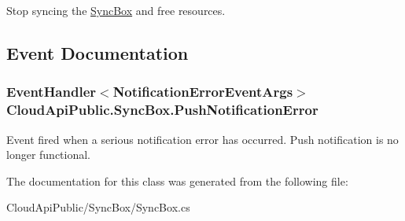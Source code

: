 Stop syncing the \hyperlink{class_cloud_api_public_1_1_sync_box}{Sync\-Box} and free resources. 



\subsection{Event Documentation}
\hypertarget{class_cloud_api_public_1_1_sync_box_a37dc0c1c783ead1a4404e90016d9df60}{
\subsubsection[{Push\-Notification\-Error}]{\setlength{\rightskip}{0pt plus 5cm}Event\-Handler$<${\bf Notification\-Error\-Event\-Args}$>$ Cloud\-Api\-Public.\-Sync\-Box.\-Push\-Notification\-Error}}\label{class_cloud_api_public_1_1_sync_box_a37dc0c1c783ead1a4404e90016d9df60}


Event fired when a serious notification error has occurred. Push notification is no longer functional. 



The documentation for this class was generated from the following file\-:\begin{DoxyCompactItemize}
\item 
Cloud\-Api\-Public/\-Sync\-Box/Sync\-Box.\-cs\end{DoxyCompactItemize}
